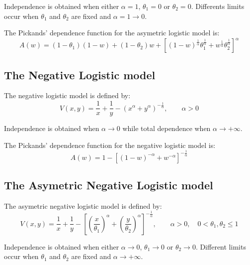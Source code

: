 \documentclass[11pt,a4paper]{article}
\numberwithin{equation}{section}
\theoremstyle{definition}
\begin{document}
Independence is obtained when either $\alpha=1$, $\theta_1=0$ or
$\theta_2=0$. Differents limits occur when $\theta_1$ and $\theta_2$
are fixed and $\alpha=1 \rightarrow 0$.

The Pickands' dependence function for the asymetric logistic model is:
\begin{displaymath}
  A(w) = \left(1 - \theta_1 \right) \left(1 - w\right) +  \left(1 -
    \theta_2 \right) w + \left[ (1 - w)^{\frac{1}{\alpha}}
    \theta_1^{\frac{1}{\alpha}} + w^{\frac{1}{\alpha}}
    \theta_2^{\frac{1}{\alpha}} \right]^{\alpha}
\end{displaymath}

\subsection{The Negative Logistic model}

The negative logistic model is defined by:
\begin{equation}
  \label{eq:negLog}
  V(x,y) = \frac{1}{x} + \frac{1}{y} - \left(x^{\alpha} + y^{\alpha}
  \right)^{-\frac{1}{\alpha}}, \qquad \alpha > 0
\end{equation}

Independence is obtained when $\alpha \rightarrow 0$ while total
dependence when $\alpha \rightarrow +\infty$. 

The Pickands' dependence function for the negative logistic model is:
\begin{displaymath}
  A(w) = 1 - \left[ (1 - w)^{-\alpha} + w^{-\alpha}
  \right]^{-\frac{1}{\alpha}}
\end{displaymath} 

\subsection{The Asymetric Negative Logistic model}

The asymetric negative logistic model is defined by:
\begin{displaymath}
  V(x,y) = \frac{1}{x} + \frac{1}{y} - \left[ \left(\frac{x}{\theta_1}
    \right)^\alpha  + \left(\frac{y}{\theta_2} \right)^\alpha
  \right]^{-\frac{1}{\alpha}}, \qquad \alpha > 0, \quad 0 <
  \theta_1, \theta_2 \leq 1
\end{displaymath}

Independence is obtained when either $\alpha \rightarrow 0$, $\theta_1
\rightarrow 0$ or $\theta_2 \rightarrow 0$. Different limits occur
when $\theta_1$ and $\theta_2$ are fixed and $\alpha \rightarrow
+\infty$.
\end{document}

